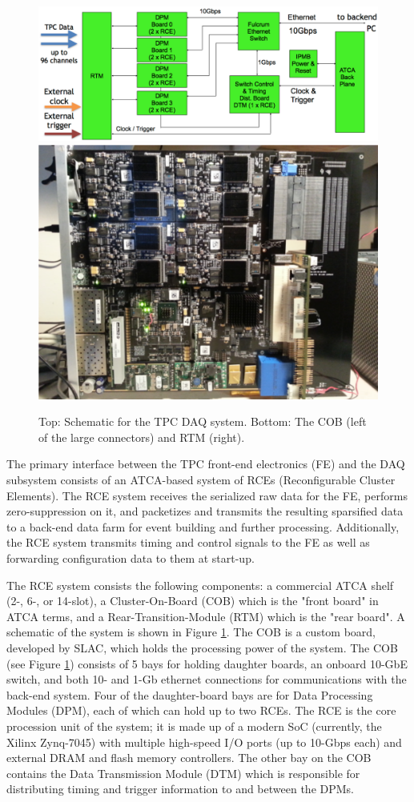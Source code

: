 \begin{figure}[htb]
\centering
\begin{minipage}[b]{1.0\textwidth}
\begin{center}
\includegraphics[width=1.0\textwidth]{figures/rce-block.pdf}
\includegraphics[width=.5\textwidth]{figures/COB-gen3.pdf}
\end{center}
\end{minipage}
\caption{Top: Schematic for the TPC DAQ system. Bottom: The COB (left of the large connectors) and RTM (right).}
\label{fig:rce}
\end{figure}

The primary interface between the TPC front-end electronics (FE) and the DAQ subsystem consists of an ATCA-based system of RCEs (Reconfigurable Cluster Elements).  The RCE system receives the serialized raw data for the FE, performs zero-suppression on it, and packetizes and transmits the resulting sparsified data to a back-end data farm for event building and further processing.  Additionally, the RCE system transmits timing and control signals to the FE as well as forwarding configuration data to them at start-up.     

The RCE system consists the following components:  a commercial ATCA shelf (2-, 6-, or 14-slot), a Cluster-On-Board (COB) which is the "front board" in ATCA terms, and a Rear-Transition-Module (RTM) which is the "rear board". A schematic of the system is shown in Figure \ref{fig:rce}.  The COB is a custom board, developed by SLAC, which holds the processing power of the system.  The COB (see Figure \ref{fig:rce}) consists of 5 bays for holding daughter boards, an onboard 10-GbE switch, and both 10- and 1-Gb ethernet connections for communications with the back-end system.  Four of the daughter-board bays are for Data Processing Modules (DPM), each of which can hold up to two RCEs.  The RCE is the core procession unit of the system; it is made up of a modern SoC (currently, the Xilinx Zynq-7045) with multiple high-speed I/O ports (up to 10-Gbps each) and external DRAM and flash memory controllers.  The other bay on the COB contains the Data Transmission Module (DTM) which is responsible  for distributing timing and trigger information to and between the DPMs.  

